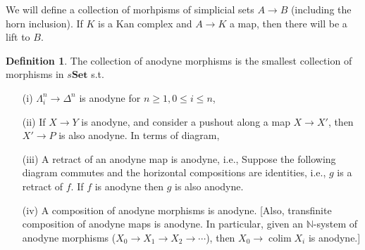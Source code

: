 \documentclass{article}
\theoremstyle{definition}
\newtheorem{defn}{Definition}[section]
\theoremstyle{remark}
\theoremstyle{plain}
\newcommand{\NN}{\mathbb{N}}
\newcommand{\bset}{\mathbf{Set}}
\begin{document}
We will define a collection of morhpisms of simplicial sets $A\to B$ (including the horn inclusion). If $K$ is a Kan complex and $A\to K$ a map, then there will be a lift to $B$.
\begin{defn}
    The collection of anodyne morphisms is the smallest collection of morphisms in $s\bset$ s.t.
    \begin{enumerate}
        \item[(i)] $\Lambda_i^n\to\Delta^n$ is anodyne for $n\ge 1, 0\le i\le n$,
        \item[(ii)] If $X\to Y$ is anodyne, and consider a pushout along a map $X\to X'$, then $X'\to P$ is also anodyne. In terms of diagram,
        \begin{center}
        \end{center}
        \item[(iii)] A retract of an anodyne map is anodyne, i.e., Suppose the following diagram commutes and the horizontal compositions are identities, i.e., $g$ is a retract of $f$. If $f$ is anodyne then $g$ is also anodyne. 
        \begin{center}
        \end{center}
        \item[(iv)] A composition of anodyne morphisms is anodyne. [Also, transfinite composition of anodyne maps is anodyne. In particular, given an $\NN$-system of anodyne morphisms ($X_0\to X_1\to X_2\to\cdots$), then $X_0\to\operatorname{colim} X_i$ is anodyne.]
    \end{enumerate}
\end{defn}
\end{document}

